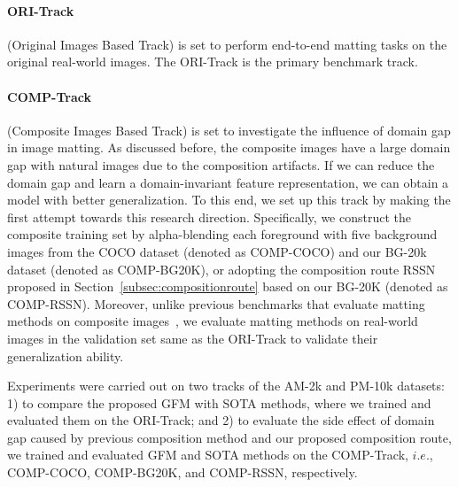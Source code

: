 \documentclass[twocolumn]{svjour3}
\begin{document}
\paragraph{ORI-Track} (Original Images Based Track) is set to perform end-to-end matting tasks on the original real-world images. The ORI-Track is the primary benchmark track.

\paragraph{COMP-Track} (Composite Images Based Track) is set to investigate the influence of domain gap in image matting. As discussed before, the composite images have a large domain gap with natural images due to the composition artifacts. If we can reduce the domain gap and learn a domain-invariant feature representation, we can obtain a model with better generalization. To this end, we set up this track by making the first attempt towards this research direction. Specifically, we construct the composite training set by alpha-blending each foreground with five background images from the COCO dataset \citep{lin2014microsoft} (denoted as COMP-COCO) and our BG-20k dataset (denoted as COMP-BG20K), or adopting the composition route RSSN proposed in Section~\ref{subsec:compositionroute} based on our BG-20K (denoted as COMP-RSSN). Moreover, unlike previous benchmarks that evaluate matting methods on composite images~\citep{xu2017deep,zhang2019late,Qiao_2020_CVPR}, we evaluate matting methods on real-world images in the validation set same as the ORI-Track to validate their generalization ability.

Experiments were carried out on two tracks of the AM-2k and PM-10k datasets: 1) to compare the proposed GFM with SOTA methods, where we trained and evaluated them on the ORI-Track; and 2) to evaluate the side effect of domain gap caused by previous composition method and our proposed composition route, we trained and evaluated GFM and SOTA methods on the COMP-Track, $i.e.$, COMP-COCO, COMP-BG20K, and COMP-RSSN, respectively.
\end{document}
